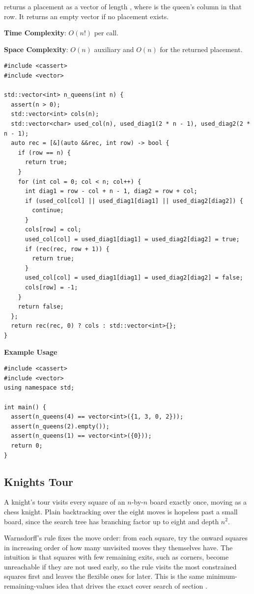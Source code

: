 \begin{compactitem}
  \item {} returns a placement as a vector  of length , where  is the queen's column in that row. It returns an empty vector if no placement exists.
\end{compactitem}

\textbf{Time Complexity}: $O(n!)$ per call.

\textbf{Space Complexity}: $O(n)$ auxiliary and $O(n)$ for the returned placement.

\begin{lstlisting}[style=cpp]
#include <cassert>
#include <vector>

std::vector<int> n_queens(int n) {
  assert(n > 0);
  std::vector<int> cols(n);
  std::vector<char> used_col(n), used_diag1(2 * n - 1), used_diag2(2 * n - 1);
  auto rec = [&](auto &&rec, int row) -> bool {
    if (row == n) {
      return true;
    }
    for (int col = 0; col < n; col++) {
      int diag1 = row - col + n - 1, diag2 = row + col;
      if (used_col[col] || used_diag1[diag1] || used_diag2[diag2]) {
        continue;
      }
      cols[row] = col;
      used_col[col] = used_diag1[diag1] = used_diag2[diag2] = true;
      if (rec(rec, row + 1)) {
        return true;
      }
      used_col[col] = used_diag1[diag1] = used_diag2[diag2] = false;
      cols[row] = -1;
    }
    return false;
  };
  return rec(rec, 0) ? cols : std::vector<int>{};
}
\end{lstlisting}
\textbf{Example Usage}\par
\begin{lstlisting}[style=cpp]
#include <cassert>
#include <vector>
using namespace std;

int main() {
  assert(n_queens(4) == vector<int>({1, 3, 0, 2}));
  assert(n_queens(2).empty());
  assert(n_queens(1) == vector<int>({0}));
  return 0;
}
\end{lstlisting}
\subsection{Knights Tour}
\label{sec:1.8.7}
A knight's tour visits every square of an $n$-by-$n$ board exactly once, moving as a chess knight. Plain backtracking over the eight moves is hopeless past a small board, since the search tree has branching factor up to eight and depth $n^2$.

Warnsdorff's rule fixes the move order: from each square, try the onward squares in increasing order of how many unvisited moves they themselves have. The intuition is that squares with few remaining exits, such as corners, become unreachable if they are not used early, so the rule visits the most constrained squares first and leaves the flexible ones for later. This is the same minimum-remaining-values idea that drives the exact cover search of section .

